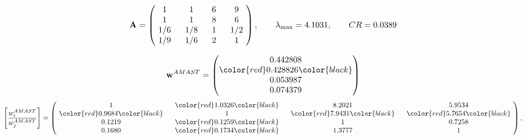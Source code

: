 \begin{example}
\begin{equation*}
\mathbf{A} =
\begin{pmatrix}
$\,\,$ 1 $\,\,$ & $\,\,$1$\,\,$ & $\,\,$6$\,\,$ & $\,\,$9 $\,\,$ \\
$\,\,$ 1 $\,\,$ & $\,\,$ 1 $\,\,$ & $\,\,$8$\,\,$ & $\,\,$6 $\,\,$ \\
$\,\,$ 1/6$\,\,$ & $\,\,$ 1/8$\,\,$ & $\,\,$ 1 $\,\,$ & $\,\,$ 1/2 $\,\,$ \\
$\,\,$ 1/9$\,\,$ & $\,\,$ 1/6$\,\,$ & $\,\,$2$\,\,$ & $\,\,$ 1  $\,\,$ \\
\end{pmatrix},
\qquad
\lambda_{\max} =
4.1031,
\qquad
CR = 0.0389
\end{equation*}

\begin{equation*}
\mathbf{w}^{AMAST} =
\begin{pmatrix}
0.442808\\
\color{red} 0.428826\color{black} \\
0.053987\\
0.074379
\end{pmatrix}\end{equation*}
\begin{equation*}
\left[ \frac{{w}^{AMAST}_i}{{w}^{AMAST}_j} \right] =
\begin{pmatrix}
$\,\,$ 1 $\,\,$ & $\,\,$\color{red} 1.0326\color{black} $\,\,$ & $\,\,$8.2021$\,\,$ & $\,\,$5.9534$\,\,$ \\
$\,\,$\color{red} 0.9684\color{black} $\,\,$ & $\,\,$ 1 $\,\,$ & $\,\,$\color{red} 7.9431\color{black} $\,\,$ & $\,\,$\color{red} 5.7654\color{black}   $\,\,$ \\
$\,\,$0.1219$\,\,$ & $\,\,$\color{red} 0.1259\color{black} $\,\,$ & $\,\,$ 1 $\,\,$ & $\,\,$0.7258 $\,\,$ \\
$\,\,$0.1680$\,\,$ & $\,\,$\color{red} 0.1734\color{black} $\,\,$ & $\,\,$1.3777$\,\,$ & $\,\,$ 1  $\,\,$ \\
\end{pmatrix},
\end{equation*}


\end{example}
